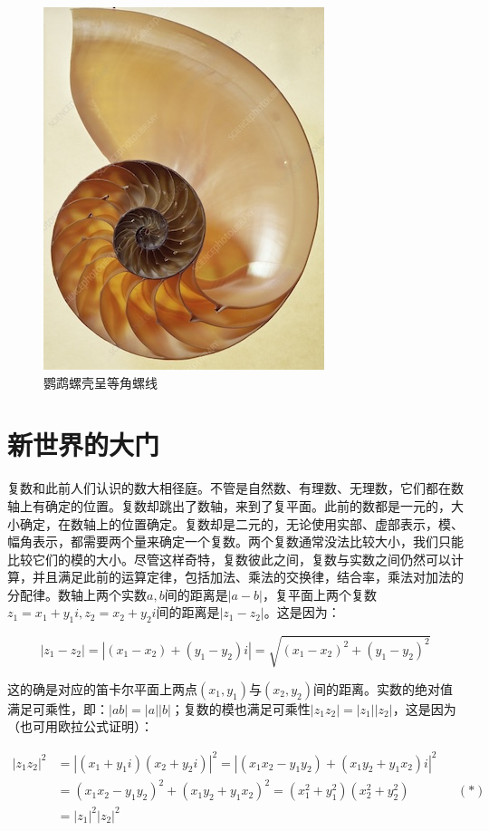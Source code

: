 \documentclass[b5paper]{ctexart}
\begin{document}
\begin{figure}[htbp]
 \centering
 \includegraphics[scale=0.4]{img/nautilus}
 \caption{鹦鹉螺壳呈等角螺线}
 \label{fig:nautilus}
\end{figure}

\section{新世界的大门}

复数和此前人们认识的数大相径庭。不管是自然数、有理数、无理数，它们都在数轴上有确定的位置。复数却跳出了数轴，来到了复平面。此前的数都是一元的，大小确定，在数轴上的位置确定。复数却是二元的，无论使用实部、虚部表示，模、幅角表示，都需要两个量来确定一个复数。两个复数通常没法比较大小，我们只能比较它们的模的大小。尽管这样奇特，复数彼此之间，复数与实数之间仍然可以计算，并且满足此前的运算定律，包括加法、乘法的交换律，结合率，乘法对加法的分配律。数轴上两个实数$a, b$间的距离是$|a - b|$，复平面上两个复数$z_1 = x_1 + y_1i, z_2 = x_2 + y_2i$间的距离是$|z_1 - z_2|$。这是因为：

\[
|z_1 - z_2| = |(x_1 - x_2) + (y_1 - y_2)i| = \sqrt{(x_1 - x_2)^2 + (y_1 - y_2)^2}
\]

这的确是对应的笛卡尔平面上两点$(x_1, y_1)$与$(x_2, y_2)$间的距离。实数的绝对值满足可乘性，即：$|ab| = |a||b|$；复数的模也满足可乘性$|z_1z_2| = |z_1||z_2|$，这是因为（也可用欧拉公式证明）：

\begin{align*}
|z_1z_2|^2 &= |(x_1 + y_1i)(x_2 + y_2i)|^2 = |(x_1x_2 - y_1y_2) + (x_1y_2 + y_1x_2)i|^2 \\
  &= (x_1x_2 - y_1y_2)^2 + (x_1y_2 + y_1x_2)^2 = (x_1^2 + y_1^2)(x_2^2 + y_2^2) && (*) \\
  &= |z_1|^2|z_2|^2
\end{align*}
\end{document}
